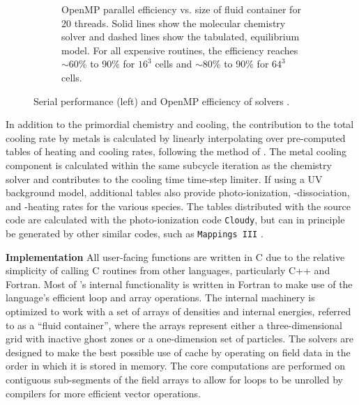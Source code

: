 \begin{figure}[h]
\begin{subfigure}{.42\textwidth}
  \caption{OpenMP parallel efficiency vs. size of fluid container for
    20 threads.  Solid lines show the molecular
    chemistry solver and dashed lines show the tabulated, equilibrium
    model.  For all expensive routines, the efficiency reaches
    $\sim$60\% to 90\% for $16^3$ cells and $\sim$80\% to 90\% for
    $64^3$ cells.}
  \label{fig:openmp}
\end{subfigure}%
\vspace*{-0.5\baselineskip}
\caption{Serial performance (left) and OpenMP efficiency of
   solvers \citep[from][]{2017MNRAS.466.2217S}.}
\label{fig:performance}
\vspace*{-0.5\baselineskip}
\end{figure}

In addition to the primordial chemistry and cooling, the contribution
to the total cooling rate by metals is calculated by linearly
interpolating over pre-computed tables of heating and cooling rates,
following the method of \citet{2008MNRAS.385.1443S}.
The metal cooling component is calculated within the same subcycle
iteration as the chemistry solver and contributes to the cooling time
time-step limiter.
If using a UV background model,
additional tables also provide photo-ionization, -dissociation, and
-heating rates for the various species.
The tables distributed with the source code are calculated with the
photo-ionization code \texttt{Cloudy}, but can in principle be
generated by other similar codes, such as \texttt{Mappings III}
\citep{1993ApJS...88..253S}.

\noindent
{\bf Implementation}
All user-facing \grackle{} functions are written in C due
to the relative simplicity of calling C routines from other
languages, particularly C++ and Fortran.  Most of \grackle{}'s
internal functionality is written in Fortran to make use of the
language's efficient loop and array operations.
The internal machinery is optimized to work with a set of arrays of
densities and internal energies, referred to as a ``fluid
container'', where the arrays represent either a three-dimensional
grid with inactive ghost zones or a one-dimension set of particles.
The solvers are designed to make the best possible use of cache by
operating on field data in the order in which it is stored in memory.
The core computations are performed on
contiguous sub-segments of the field arrays to allow for loops to be
unrolled by compilers for more efficient vector operations.

